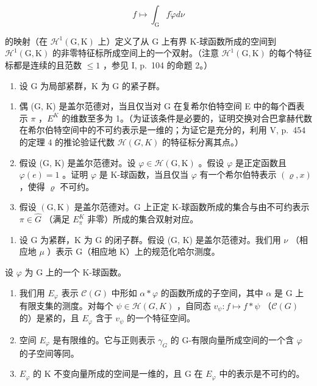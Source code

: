\[
f \mapsto \int_ {\mathrm{G}} f \check {\varphi} d \nu
\]

的映射（在 \(\mathcal{H}^{1}(\mathrm{G},\mathrm{K})\) 上）定义了从 G 上有界 K-球函数所成的空间到 \(\mathcal{H}^{1}(\mathrm{G},\mathrm{K})\) 的非零特征标所成空间上的一个双射。（注意 \(\mathcal{H}^{1}(\mathrm{G},\mathrm{K})\) 的每个特征标都是连续的且范数 \(\leqslant 1\) ，参见 I, p.~104 的命题 2。）

\begin{enumerate}
\def\labelenumi{\arabic{enumi})}
\setcounter{enumi}{27}
\tightlist
\item
  设 G 为局部紧群，K 为 G 的紧子群。
\end{enumerate}

\begin{enumerate}
\def\labelenumi{\alph{enumi})}
\item
  偶 (G, K) 是盖尔范德对，当且仅当对 G 在复希尔伯特空间 E 中的每个酉表示 \(\pi\) ，\(E^{K}\) 的维数至多为 1。（为证该条件是必要的，证明交换对合巴拿赫代数在希尔伯特空间中的不可约表示是一维的；为证它是充分的，利用 V, p.~454 的定理 4 的推论验证代数 \(\mathcal{H}(G,K)\) 的特征标分离其点。）
\item
  假设 (G, K) 是盖尔范德对。设 \(\varphi \in \mathcal{H}(\mathrm{G},\mathrm{K})\) 。假设 \(\varphi\) 是正定函数且 \(\varphi(e) = 1\) 。证明 \(\varphi\) 是 K-球函数，当且仅当 \(\varphi\) 有一个希尔伯特表示 \((\varrho, x)\) ，使得 \(\varrho\) 不可约。
\item
  假设 \((\mathrm{G},\mathrm{K})\) 是盖尔范德对。G 上正定 K-球函数所成的集合与由不可约表示 \(\pi\in\widehat{G}\) （满足 \(E_{\pi}^{K}\) 非零）所成的集合双射对应。
\end{enumerate}

\begin{enumerate}
\def\labelenumi{\arabic{enumi})}
\setcounter{enumi}{28}
\tightlist
\item
  设 G 为紧群，K 为 G 的闭子群。假设 (G, K) 是盖尔范德对。我们用 \(\nu\) （相应地 \(\mu\) ）表示 G（相应地 K）上的规范化哈尔测度。
\end{enumerate}

设 \(\varphi\) 为 G 上的一个 K-球函数。

\begin{enumerate}
\def\labelenumi{\alph{enumi})}
\item
  我们用 \(E_{\varphi}\) 表示 \(\mathcal{C}(G)\) 中形如 \(\alpha * \varphi\) 的函数所成的子空间，其中 \(\alpha\) 是 G 上有限支集的测度。对每个 \(\psi \in \mathcal{H}(G, K)\) ，自同态 \(v_{\psi}: f \mapsto f * \psi\) （\(\mathcal{C}(G)\) 的）是紧的，且 \(E_{\varphi}\) 含于 \(v_{\psi}\) 的一个特征空间。
\item
  空间 \(E_{\varphi}\) 是有限维的。它与正则表示 \(\gamma_{G}\) 的 G-有限向量所成空间的一个含 \(\varphi\) 的子空间等同。
\item
  \(E_{\varphi}\) 的 K 不变向量所成的空间是一维的，且 G 在 \(E_{\varphi}\) 中的表示是不可约的。
\end{enumerate}

